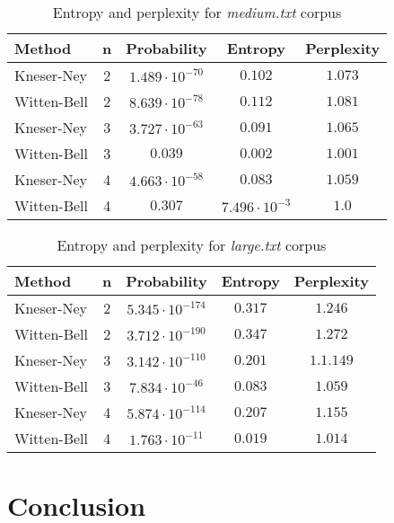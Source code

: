 \documentclass[10pt, a4paper]{article}
\begin{document}
\begin{table}[h]
\caption{Entropy and perplexity for \textit{medium.txt} corpus}
\label{tab:medium}
\begin{center}
\begin{tabular}{lcccc}
\toprule
Method & n & Probability & Entropy & Perplexity \\
\midrule
Kneser-Ney & 2 & $1.489 \cdot 10^{-70}$ & $0.102$ & $1.073$ \\
Witten-Bell & 2 & $8.639 \cdot 10^{-78}$ & $0.112$ & $1.081$ \\

Kneser-Ney & 3 & $3.727 \cdot 10^{-63}$ & $0.091$ & $1.065$ \\
Witten-Bell & 3 & $0.039$ & $0.002$ & $1.001$ \\

Kneser-Ney & 4 & $4.663 \cdot 10^{-58}$ & $0.083$ & $1.059$ \\
Witten-Bell & 4 & $0.307$ & $7.496 \cdot 10^{-3}$ & $1.0$ \\
\bottomrule
\end{tabular}
\end{center}
\end{table}


\begin{table}[h]
\caption{Entropy and perplexity for \textit{large.txt} corpus}
\label{tab:large}
\begin{center}
\begin{tabular}{lcccc}
\toprule
Method & n & Probability & Entropy & Perplexity \\
\midrule
Kneser-Ney & 2 & $5.345 \cdot 10^{-174}$ & $0.317$ & $1.246$ \\
Witten-Bell & 2 & $3.712 \cdot 10^{-190}$ & $0.347$ & $1.272$ \\

Kneser-Ney & 3 & $3.142 \cdot 10^{-110}$ & $0.201$ & $1.1.149$ \\
Witten-Bell & 3 & $7.834 \cdot 10^{-46}$ & $0.083$ & $1.059$ \\

Kneser-Ney & 4 & $5.874 \cdot 10^{-114}$ & $0.207$ & $1.155$ \\
Witten-Bell & 4 & $1.763 \cdot 10^{-11}$ & $0.019$ & $1.014$ \\
\bottomrule
\end{tabular}
\end{center}
\end{table}

\section{Conclusion}
\end{document}
